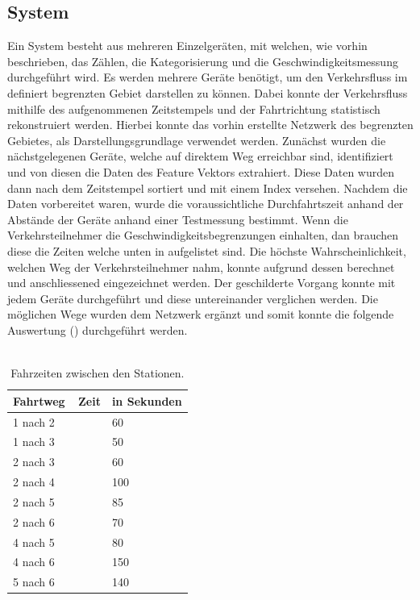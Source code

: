 \subsection{System}
Ein System besteht aus mehreren Einzelgeräten, mit welchen, wie vorhin beschrieben, das Zählen, die Kategorisierung und die Geschwindigkeitsmessung durchgeführt wird. Es werden mehrere Geräte benötigt, um den Verkehrsfluss im definiert begrenzten Gebiet darstellen zu können. Dabei konnte der Verkehrsfluss mithilfe des aufgenommenen Zeitstempels und der Fahrtrichtung statistisch rekonstruiert werden. Hierbei konnte das vorhin erstellte Netzwerk des begrenzten Gebietes, als Darstellungsgrundlage verwendet werden. Zunächst wurden die nächstgelegenen Geräte, welche auf direktem Weg erreichbar sind, identifiziert und von diesen die Daten des Feature Vektors extrahiert. Diese Daten wurden dann nach dem Zeitstempel sortiert und mit einem Index versehen. Nachdem die Daten vorbereitet waren, wurde die voraussichtliche Durchfahrtszeit anhand der Abstände der Geräte anhand einer Testmessung bestimmt. Wenn die Verkehrsteilnehmer die Geschwindigkeitsbegrenzungen einhalten, dan brauchen diese die Zeiten welche unten in   aufgelistet sind. Die höchste Wahrscheinlichkeit, welchen Weg der Verkehrsteilnehmer nahm, konnte aufgrund dessen berechnet und anschliessened eingezeichnet werden. Der geschilderte Vorgang konnte mit jedem Geräte durchgeführt und diese untereinander verglichen werden. Die möglichen Wege wurden dem Netzwerk ergänzt und somit konnte die folgende Auswertung () durchgeführt werden.\\\\

\begin{table}[H]
\centering
    \begin{tabular}{p{3cm}|p{1.5cm} p{2.2cm}}
    \textbf{Fahrtweg}        &    \textbf{\;\;\;\;\;\,Zeit}      & \textbf{in Sekunden}   \\ \hline
    1 nach 2                 &          & 60  \\
    1 nach 3		         &          & 50  \\
    2 nach 3	             &          & 60  \\ 
    2 nach 4	             &          & 100 \\
    2 nach 5                 &          & 85  \\
    2 nach 6                 &  		& 70  \\
    4 nach 5                 &  		& 80  \\
    4 nach 6                 &  		& 150 \\
    5 nach 6                 &  		& 140 \\   
\end{tabular}
\caption{Fahrzeiten zwischen den Stationen.}
\label{tFahrzeiten}
\end{table}

